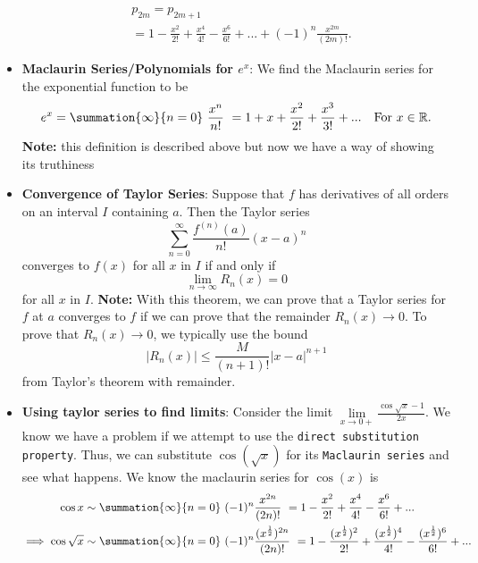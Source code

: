 \documentclass{report}
\begin{document}
\begin{itemize}
\begin{align*}
                    &p_{2m} = p_{2m+1} \\
                    &=1 - \frac{x^{2}}{2!} + \frac{x^{4}}{4!} -\frac{x^{6}}{6!}     + ... + (-1)^{n}\frac{x^{2m}}{(2m)!}
                .\end{align*}
            \item \textbf{Maclaurin Series/Polynomials for $e^{x}$}: We find the Maclaurin series for the exponential function to be 
                \begin{align*}
                    e^{x} = \summation{\infty}{n=0}\ \frac{x^{n}}{n!}\  = 1 + x + \frac{x^{2}}{2!} + \frac{x^{3}}{3!} + ... \quad \text{For } x\in\mathbb{R}
                .\end{align*}
                \bigbreak \noindent 
                \textbf{Note:} this definition is described above but now we have a way of showing its truthiness
            \item \textbf{Convergence of Taylor Series}:
                Suppose that $f$ has derivatives of all orders on an interval $I$ containing $a$. Then the Taylor series
                \[
                    \sum_{n=0}^{\infty} \frac{f^{(n)}(a)}{n!}(x-a)^n
                \]
                converges to $f(x)$ for all $x$ in $I$ if and only if
                \[
                    \lim_{n \to \infty} R_n(x) = 0
                \]
                for all $x$ in $I$.
                \bigbreak \noindent 
                \textbf{Note:}  With this theorem, we can prove that a Taylor series for $f$ at $a$ converges to $f$ if we can prove that the remainder $R_n(x) \to 0$. To prove that $R_n(x) \to 0$, we typically use the bound
                \[
                    |R_n(x)| \leq \frac{M}{(n+1)!}|x - a|^{n+1}
                \]
                from Taylor’s theorem with remainder.
            \item \textbf{Using taylor series to find limits}: Consider the limit $\lim\limits_{x \to 0+}{\frac{\cos{\sqrt{x}} -1}{2x}}$. We know we have a problem if we attempt to use the \texttt{direct substitution property}. Thus, we can substitute $\cos{(\sqrt{x})}$ for its \texttt{Maclaurin series} and see what happens. We know the maclaurin series for $\cos{(x)}$ is 
                \begin{align*}
                    \cos{x} &\sim \summation{\infty}{n=0}\ (-1)^{n}\frac{x^{2n}}{(2n)!}\   = 1 - \frac{x^{2}}{2!} + \frac{x^{4}}{4!} - \frac{x^{6}}{6!} + ... \\
                    \implies \cos{\sqrt{x}} &\sim \summation{\infty}{n=0}\ (-1)^{n}\frac{(x^{\frac{1}{2}})^{2n}}{(2n)!}\   = 1 - \frac{(x^{\frac{1}{2}})^{2}}{2!} + \frac{(x^{\frac{1}{2}})^{4}}{4!} - \frac{(x^{\frac{1}{2}})^{6}}{6!} + ... \\

\end{align*}
\end{itemize}
\end{document}

